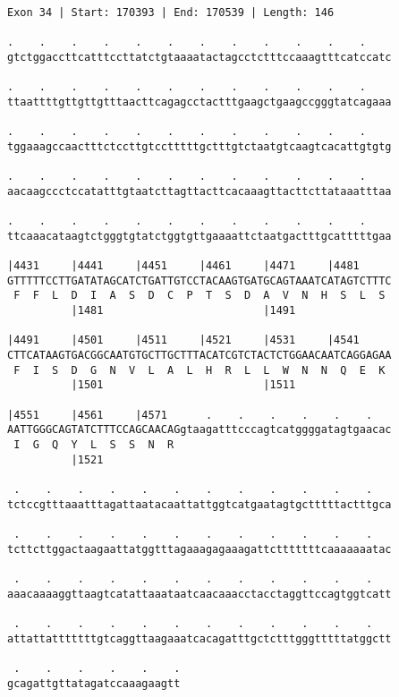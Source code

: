 \documentclass{article}
\begin{document}
\begin{Verbatim}
Exon 34 | Start: 170393 | End: 170539 | Length: 146
 
.    .    .    .    .    .    .    .    .    .    .    .    
gtctggaccttcatttccttatctgtaaaatactagcctctttccaaagtttcatccatc
  
.    .    .    .    .    .    .    .    .    .    .    .    
ttaattttgttgttgtttaacttcagagcctactttgaagctgaagccgggtatcagaaa
  
.    .    .    .    .    .    .    .    .    .    .    .    
tggaaagccaactttctccttgtcctttttgctttgtctaatgtcaagtcacattgtgtg
  
.    .    .    .    .    .    .    .    .    .    .    .    
aacaagccctccatatttgtaatcttagttacttcacaaagttacttcttataaatttaa
  
.    .    .    .    .    .    .    .    .    .    .    .    
ttcaaacataagtctgggtgtatctggtgttgaaaattctaatgactttgcatttttgaa
  
|4431     |4441     |4451     |4461     |4471     |4481     
GTTTTTCCTTGATATAGCATCTGATTGTCCTACAAGTGATGCAGTAAATCATAGTCTTTC
 F  F  L  D  I  A  S  D  C  P  T  S  D  A  V  N  H  S  L  S 
          |1481                         |1491               
  
|4491     |4501     |4511     |4521     |4531     |4541     
CTTCATAAGTGACGGCAATGTGCTTGCTTTACATCGTCTACTCTGGAACAATCAGGAGAA
 F  I  S  D  G  N  V  L  A  L  H  R  L  L  W  N  N  Q  E  K 
          |1501                         |1511               
  
|4551     |4561     |4571      .    .    .    .    .    .   
AATTGGGCAGTATCTTTCCAGCAACAGgtaagatttcccagtcatggggatagtgaacac
 I  G  Q  Y  L  S  S  N  R                                  
          |1521                                             
  
 .    .    .    .    .    .    .    .    .    .    .    .   
tctccgtttaaatttagattaatacaattattggtcatgaatagtgctttttactttgca
  
 .    .    .    .    .    .    .    .    .    .    .    .   
tcttcttggactaagaattatggtttagaaagagaaagattctttttttcaaaaaaatac
  
 .    .    .    .    .    .    .    .    .    .    .    .   
aaacaaaaggttaagtcatattaaataatcaacaaacctacctaggttccagtggtcatt
  
 .    .    .    .    .    .    .    .    .    .    .    .   
attattatttttttgtcaggttaagaaatcacagatttgctctttgggtttttatggctt
  
 .    .    .    .    .    .
gcagattgttatagatccaaagaagtt
\end{Verbatim}
\end{document}

